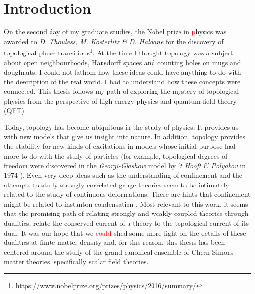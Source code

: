
    \graphicspath{{Introduction_Folder/figures/PNG/}{Introduction_Folder/figures/PDF/}{Introduction_Folder/figures/}}

\chapter*{Introduction}


On the second day of my graduate studies, \textcolor{red}{t}he Nobel prize in \textcolor{red}{p}hysics was awarded to \textit{D. Thouless, M. Kosterlitz \& D. Haldane} for the discovery of topological phase transitions\footnote{https://www.nobelprize.org/prizes/physics/2016/summary/}. At the time I thought topology was a subject about open neighbourhoods, Hausdorff spaces and counting holes on mugs and doughnuts. I could not fathom how these ideas could have anything to do with the description of the real world. I had to understand how these concepts were connected. This thesis follows my path of exploring the mystery of topological physics from the perspective of high energy physics and quantum field theory (QFT).

Today, topology has become ubiquitous in the study of physics. It provides us with new models that give us insight into nature. In addition, topology provides the stability for new kinds of excitations in models whose initial purpose had more to do with the study of particles (for example, topological degrees of freedom were discovered in the \textit{Georgi-Glashow} model \cite{Georgi:1974sy} by \textit{'t Hooft \& Polyakov} in 1974 \cite{Polyakov:1974ek, tHooft:1974kcl}). Even very deep ideas such as the understanding of confinement and the attempts to study strongly correlated gauge theories seem to be intimately related to the study of continuous deformations. There are hints that confinement might be related to instanton condensation \cite{Polyakov:1976fu}. Most relevant to this work, it seems that the promising path of relating strongly and weakly coupled theories through dualities, relate the conserved current of a theory to the topological current of its dual. It was our hope that we \textcolor{red}{could} shed some more light on the details of these dualities at finite matter density and\textcolor{red}{,} for this reason, this thesis has been centered around the study of the grand canonical ensemble of Chern-Simons matter theories, specifically scalar field theories.

